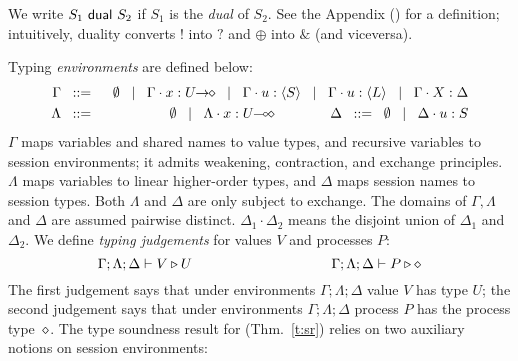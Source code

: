
We write $S_1 \ \mathsf{dual}\  S_2$ if 
$S_1$ is the \emph{dual} of $S_2$.   
See the Appendix () for a definition; 
intuitively, 
duality
converts $!$ into $?$ and $\oplus$ into $\&$ (and viceversa). 

\smallskip 

\noi Typing \emph{environments} are defined below:
\begin{eqnarray*}
	\Gamma  & \bnfis  &\emptyset \bnfbar \Gamma \cat \varp{x}: \shot{U} \bnfbar \Gamma \cat u: \chtype{S} \bnfbar \Gamma \cat u: \chtype{L} 
        \bnfbar \Gamma \cat \rvar{X}: \Delta \\
	\Lambda &\bnfis & \emptyset \bnfbar \Lambda \cat \AT{x}{\lhot{U}}
	\qquad\qquad
	\Delta  \bnfis  \emptyset \bnfbar \Delta \cat \AT{u}{S}
\end{eqnarray*}
\noi 
$\Gamma$ maps variables and shared names to value types, and recursive 
variables to session environments;  
it admits weakening, contraction, and exchange principles.
$\Lambda$ maps variables to 
 linear %
higher-order
types, and $\Delta$ maps
session names to session types. 
Both $\Lambda$ and $\Delta$ %
are
only subject to exchange.  
The domains of $\Gamma,
\Lambda$ and $\Delta$ are assumed pairwise distinct. 
$\Delta_1\cdot \Delta_2$ means 
the disjoint union of $\Delta_1$ and $\Delta_2$.  
We define \emph{typing judgements} for values $V$
and processes $P$:
	$$\Gamma; \Lambda; \Delta \vdash V \triangleright U \qquad \qquad \qquad \qquad \qquad \Gamma; \Lambda; \Delta \vdash P \triangleright \diamond$$
\noi The first judgement
says that under environments $\Gamma; \Lambda; \Delta$ value $V$
has type $U$; the second judgement says that under
environments $\Gamma; \Lambda; \Delta$ process $P$ has the process type~$\diamond$.
The type soundness result for \HOp (Thm.~\ref{t:sr})
relies on two auxiliary notions on session environments: 

